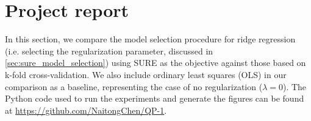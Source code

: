 

\section{Project report}

In this section, we compare the model selection procedure for ridge regression (i.e. selecting the regularization parameter, discussed in \cref{sec:sure_model_selection}) using SURE as the objective against those based on k-fold cross-validation. We also include ordinary least squares (OLS) in our comparison as a baseline, representing the case of no regularization ($\lambda=0$). The Python code used to run the experiments and generate the figures can be found at \url{https://github.com/NaitongChen/QP-1}.

